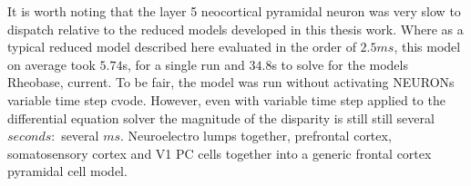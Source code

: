 It is worth noting that the layer 5 neocortical pyramidal neuron was very slow to dispatch relative to the reduced models developed in this thesis work. Where as a typical reduced model described here evaluated in the order of $2.5 ms$, this model on average took $5.74$s, for a single run and $34.8$s to solve for the models Rheobase, current. To be fair, the model was run without activating NEURONs variable time step cvode. However, even with variable time step applied to the differential equation solver the magnitude of the disparity is still still several $seconds:$ several $ ms$. Neuroelectro lumps together, prefrontal cortex, somatosensory cortex and V1 PC cells together into a generic frontal cortex pyramidal cell model.










